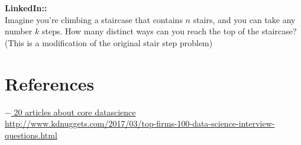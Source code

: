 \documentclass[11pt]{article}
\begin{document}
{\bf LinkedIn:: }\\
Imagine you’re climbing a staircase that contains $n$ stairs, and you can take any number $k$ steps. How many distinct ways can you reach the top of the staircase? (This is a modification of the original stair step problem) \\



\newpage
\section{References}
\href{http://www.datasciencecentral.com/profiles/blogs/20-articles-about-core-data-science}{$-$ 20 articles about core datascience}\\
\href{http://www.kdnuggets.com/2017/03/top-firms-100-data-science-interview-questions.html}{http://www.kdnuggets.com/2017/03/top-firms-100-data-science-interview-questions.html}
\end{document}
